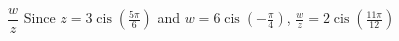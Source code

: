 { $\dfrac{w}{z}$}
{ Since $z = 3\operatorname{cis}\left(\frac{5\pi}{6}\right)$ and $w = 6\operatorname{cis}\left(-\frac{\pi}{4}\right)$,  $\frac{w}{z} = 2\operatorname{cis}\left(\frac{11\pi}{12}\right)$}
